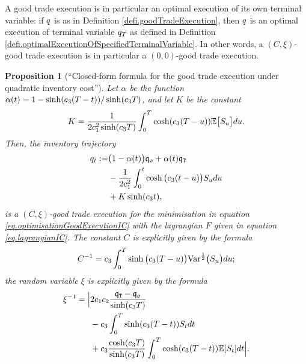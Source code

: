 \documentclass[10pt,a4paper]{article}
\newtheorem{prop}[thm]{Proposition}
\begin{document}
 	\begin{remark}
 		A good trade execution is in particular an optimal execution of its own terminal variable: if $q$ is as in Definition \ref{defi.goodTradeExecution}, then $q$ is an optimal execution of terminal variable $q_T$ as defined in Definition \ref{defi.optimalExecutionOfSpecifiedTerminalVariable}. In other words, a $(C,\xi)$-good trade execution is in particular a $(0,0)$-good trade execution.
 	\end{remark}
	
	\begin{prop}[``Closed-form formula for the good trade execution under quadratic inventory cost''] \label{prop.goodExecutionIC}
		Let $\alpha$ be the function $\alpha(t)=1-\sinh(c_{3}(T-t))/\sinh(c_{3} T)$,
		and let $K$ be the constant 
		\[
		K= \frac{1}{2c_{1}^{2} \sinh(c_{3} T)}
		\int_{0}^{T} \cosh(c_{3} (T-u))\mathbb{{E}}\big[S_u\big]du. 
		\]
		Then, the inventory trajectory
		\begin{equation}\label{eq.goodExecutionIC}
		\begin{split}
		q_t:= & 
		\big(1-\alpha(t)\big) \mathfrak{q_0} + \alpha(t)\mathfrak{q}_{\mathtt{T} } \\
		&- \frac{1}{2c_{1}^{2}}
		\int_{0}^{t} \cosh\big(c_{3} (t-u)\big)S_udu \\
		&+ K \sinh(c_{3} t),
		\end{split}
		\end{equation}
		is a $(C,\xi)$-good trade execution for the minimisation in equation \eqref{eq.optimisationGoodExecutionIC} with the lagrangian $F$ given in equation \eqref{eq.lagrangianIC}. The constant $C$ is explicitly given by the formula
		\[
		C^{-1} = c_{3}
		\int_{0}^{T} \sinh\big(c_{3} (T-u)\big)\mathrm{Var}^{\frac{1}{2}}\big(S_u\big) du;
		\]
		the random variable $\xi$ is explicitly given by the formula
		\begin{equation*}
		\begin{split}
		\xi^{-1} = 
		\Big\lvert & 
		2c_{1}c_{2} \frac{ \mathfrak{q}_{\mathtt{T} } - \mathfrak{q_0} }{\sinh(c_{3} T)} \\
		& -c_{3} \int_{0}^{T} \sinh (c_{3} (T - t))S_t dt \\
		 & +c_{3} \frac{\cosh(c_{3} T)}{\sinh(c_{3}T)}
		 \int_{0}^{T} \cosh(c_{3} (T - t))\mathbb{{E}}[S_t] dt 
		 \Big\rvert. 
		\end{split}
		\end{equation*}
	\end{prop}
\end{document}

